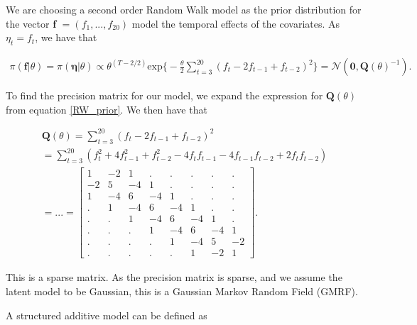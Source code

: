 We are choosing a second order Random Walk model as the prior distribution for the vector \textbf{f} $= (f_1,...,f_{20})$ model the temporal effects of the covariates. As $\eta_t = f_t$, we have that 

\begin{align} \label{RW_prior}
    \pi(\mathbf{f}|\theta) = \pi(\mathbf{\eta}|\theta) \propto
    \theta^{(T-2/2)} \text{exp} \Bigg\{  -\frac{\theta}{2} \sum_{t = 3}^{20} (f_t - 2f_{t-1} + f_{t-2})^2  \Bigg\} = \mathcal{N}(\mathbf{0}, \mathbf{Q}(\theta)^{-1}).
\end{align}


To find the precision matrix for our model, we expand the expression for $\textbf{Q}(\theta)$ from equation \ref{RW_prior}. We then have that 

\begin{align} \label{precision_mat}
    \textbf{Q}(\theta) = \sum_{t = 3}^{20} (f_t - 2f_{t-1} + f_{t-2})^2 \nonumber \\
    = \sum_{t = 3}^{20} (f_t^2 + 4f_{t-1}^2 + f_{t-2}^2 - 4f_t f_{t-1} - 4 f_{t-1} f_{t-2} + 2f_t f_{t-2}) \nonumber \\
    = ... = 
    \begin{bmatrix}
        1 & -2 & 1 & . & . & . & . & . \\
        -2 & 5 & -4 & 1 & . & . & . & .  \\
        1 & -4 & 6 & -4 & 1 & . & . &  . \\
        . & 1 & -4 & 6 & -4 & 1 & . & . \\
        . & . & 1 & -4 & 6 & -4 & 1 & . \\
        . & . & . & 1 & -4 & 6 & -4 & 1 \\
        . & . & . & . & 1& -4& 5 & -2 \\
        . & . & . & . & . & 1 & -2 & 1 
    \end{bmatrix}.
\end{align}

This is a sparse matrix. As the precision matrix is sparse, and we assume the latent model to be Gaussian, this is a Gaussian Markov Random Field (GMRF). 





A structured additive model can be defined as 

